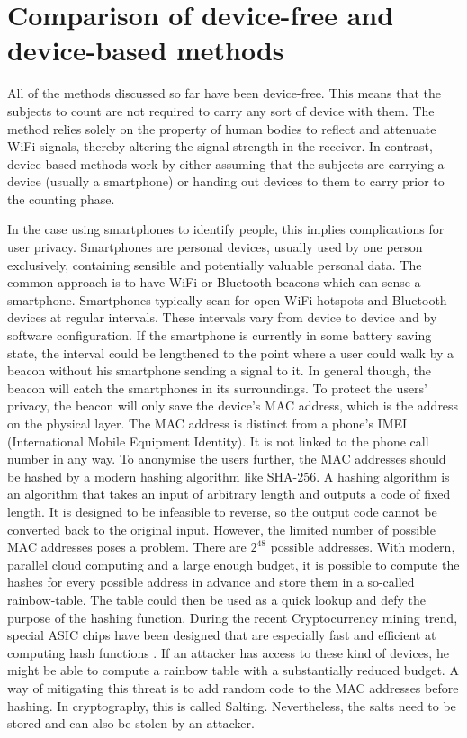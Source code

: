 \documentclass[conference]{IEEEtran}
\begin{document}
\section{Comparison of device-free and device-based methods}
All of the methods discussed so far have been device-free. This means that the subjects to count are not required to carry any sort of device with them. The method relies solely on the property of human bodies to reflect and attenuate WiFi signals, thereby altering the signal strength in the receiver. In contrast, device-based methods work by either assuming that the subjects are carrying a device (usually a smartphone) or handing out devices to them to carry prior to the counting phase.
\par
In the case using smartphones to identify people, this implies complications for user privacy. Smartphones are personal devices, usually used by one person exclusively, containing sensible and potentially valuable personal data. The common approach is to have WiFi or Bluetooth beacons which can sense a smartphone. Smartphones typically scan for open WiFi hotspots and Bluetooth devices at regular intervals. These intervals vary from device to device and by software configuration. If the smartphone is currently in some battery saving state, the interval could be lengthened to the point where a user could walk by a beacon without his smartphone sending a signal to it. In general though, the beacon will catch the smartphones in its surroundings. To protect the users' privacy, the beacon will only save the device's MAC address, which is the address on the physical layer. The MAC address is distinct from a phone's IMEI (International Mobile Equipment Identity). It is not linked to the phone call number in any way. To anonymise the users further, the MAC addresses should be hashed by a modern hashing algorithm like SHA-256. A hashing algorithm is an algorithm that takes an input of arbitrary length and outputs a code of fixed length. It is designed to be infeasible to reverse, so the output code cannot be converted back to the original input. However, the limited number of possible MAC addresses poses a problem. There are $2^48$ possible addresses. With modern, parallel cloud computing and a large enough budget, it is possible to compute the hashes for every possible address in advance and store them in a so-called rainbow-table. The table could then be used as a quick lookup and defy the purpose of the hashing function. During the recent Cryptocurrency mining trend, special ASIC chips have been designed that are especially fast and efficient at computing hash functions \cite{crypto}. If an attacker has access to these kind of devices, he might be able to compute a rainbow table with a substantially reduced budget. A way of mitigating this threat is to add random code to the MAC addresses before hashing. In cryptography, this is called Salting. Nevertheless, the salts need to be stored and can also be stolen by an attacker.
\end{document}
